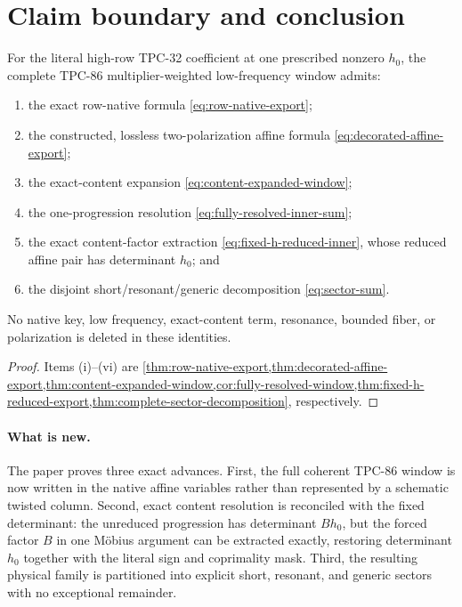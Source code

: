 \section{Claim boundary and conclusion}
\label{sec:claim-boundary}

\begin{theorem}
\label{thm:audited-conclusion}
For the literal high-row TPC-32 coefficient at one prescribed
nonzero \(h_0\), the complete TPC-86 multiplier-weighted
low-frequency window admits:
\begin{enumerate}[label=(\roman*),leftmargin=2.2em]
\item the exact row-native formula
\eqref{eq:row-native-export};
\item the constructed, lossless two-polarization affine formula
\eqref{eq:decorated-affine-export};
\item the exact-content expansion
\eqref{eq:content-expanded-window};
\item the one-progression resolution
\eqref{eq:fully-resolved-inner-sum};
\item the exact content-factor extraction
\eqref{eq:fixed-h-reduced-inner}, whose reduced affine pair has
determinant \(h_0\); and
\item the disjoint short/resonant/generic decomposition
\eqref{eq:sector-sum}.
\end{enumerate}
No native key, low frequency, exact-content term, resonance, bounded
fiber, or polarization is deleted in these identities.
\end{theorem}

\begin{proof}
Items (i)--(vi) are
\cref{thm:row-native-export,thm:decorated-affine-export,thm:content-expanded-window,cor:fully-resolved-window,thm:fixed-h-reduced-export,thm:complete-sector-decomposition},
respectively.
\end{proof}

\paragraph{What is new.}
The paper proves three exact advances.
First, the full coherent TPC-86 window is now written in the native
affine variables rather than represented by a schematic twisted
column.  Second, exact content resolution is reconciled with the
fixed determinant: the unreduced progression has determinant
\(Bh_0\), but the forced factor \(B\) in one M\"obius argument can be
extracted exactly, restoring determinant \(h_0\) together with the
literal sign and coprimality mask.  Third, the resulting physical
family is partitioned into explicit short, resonant, and generic
sectors with no exceptional remainder.


